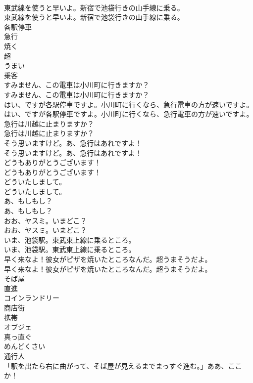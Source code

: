 \documentclass[8pt]{extreport}
\begin{document}
\begin{CJK}{UTF8}{min}
\\	東武線を使うと早いよ。新宿で池袋行きの山手線に乗る。	
\\	東武線を使うと早いよ。新宿で池袋行きの山手線に乗る。 
\\	各駅停車
\\	急行
\\	焼く
\\	超
\\	うまい
\\	乗客
\\	すみません、この電車は小川町に行きますか？	
\\	すみません、この電車は小川町に行きますか？ 
\\	はい、ですが各駅停車ですよ。小川町に行くなら、急行電車の方が速いですよ。	
\\	はい、ですが各駅停車ですよ。小川町に行くなら、急行電車の方が速いですよ。 
\\	急行は川越に止まりますか？	
\\	急行は川越に止まりますか？ 
\\	そう思いますけど。あ、急行はあれですよ！	
\\	そう思いますけど。あ、急行はあれですよ！ 
\\	どうもありがとうございます！	
\\	どうもありがとうございます！ 
\\	どういたしまして。	
\\	どういたしまして。 
\\	あ、もしもし？	
\\	あ、もしもし？ 
\\	おお、ヤスミ。いまどこ？	
\\	おお、ヤスミ。いまどこ？ 
\\	いま、池袋駅。東武東上線に乗るところ。	
\\	いま、池袋駅。東武東上線に乗るところ。 
\\	早く来なよ！彼女がピザを焼いたところなんだ。超うまそうだよ。	
\\	早く来なよ！彼女がピザを焼いたところなんだ。超うまそうだよ。 
\\	そば屋
\\	直進
\\	コインランドリー
\\	商店街
\\	携帯
\\	オブジェ
\\	真っ直ぐ
\\	めんどくさい
\\	通行人
\\	「駅を出たら右に曲がって、そば屋が見えるまでまっすぐ進む。」ああ、ここか！	

\end{CJK}
\end{document}
